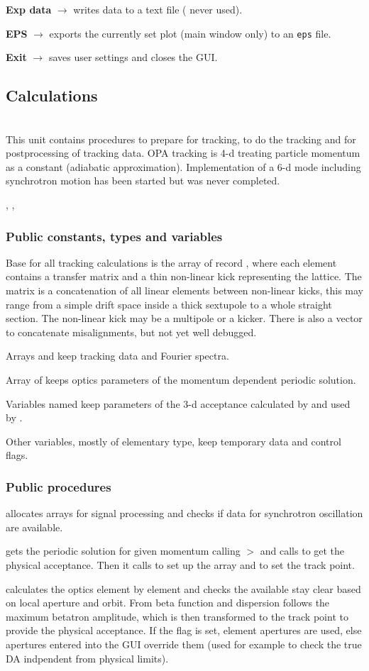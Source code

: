 \documentclass[12pt]{article}
\newcommand\code[1]{{\tt #1}}
\newcommand{\ofld}[1]{\colorbox{black!15}{{{\color{black}\bf #1}}}}
\newcommand\guico[1]{{\color{blue}\code{#1}}}
\newcommand{\unico}[1]{{\color{burntorange}\code{#1}}}
\newcommand{\evcod}[2]{\ofld{#1} $\rightarrow$ \guico{#2}}
\newcommand{\prcod}[2]{\opauni{#1}$>$\unico{#2}}
\newcommand{\opauni}[1]{\colorbox{orange!30}{{\color{black}\code{#1}}}}
\newcommand{\ounih}[2]{\subsection{\label{#2}#1}{\Huge\opauni{#2}}\\}
\newcommand{\ouni}[1]{\hyperref[#1]{\opauni{#1}}}
\newcommand{\uses}[1]{\flushleft {\bf Uses:} #1}
\newcommand{\desc}[1]{#1}
\newcommand{\pvar}[1]{\subsubsection*{Public constants, types and variables} #1}
\newcommand{\ppro}[1]{\subsubsection*{Public procedures} #1}
\newcommand{\todo}[1]{{\color{red} #1}}
\begin{document}
\evcod{Exp data}{butFileClick} writes data to a text file (\todo{never used}).

\evcod{EPS}{butPSClick} exports the currently set plot (main window only) to an \code{eps} file.

\evcod{Exit}{Exit} saves user settings and closes the GUI.


\ounih{Calculations}{tracklib}

\desc{This unit contains procedures to prepare for tracking, to do the tracking and for postprocessing of tracking data. OPA tracking is 4-d treating particle momentum as a constant (adiabatic approximation). \todo{Implementation of a 6-d mode including synchrotron motion has been started but was never completed.}
}

\uses{\ouni{linoplib}, \ouni{elemlib}, \ouni{globlib} \ouni{mathlib}}

\pvar{
Base for all tracking calculations is the array \unico{TMat} of record \unico{TrackMatrixType}, where each element contains a transfer matrix and a thin non-linear kick representing the lattice. The matrix is a concatenation of all linear elements between non-linear kicks, this may range from a simple drift space inside a thick sextupole to a whole straight section. The non-linear kick may be a multipole or a kicker. \todo{There is also a vector to concatenate misalignments, but not yet well debugged.}

Arrays \unico{data1,2} and \unico{FFT1,2} keep tracking data and Fourier spectra.

Array \unico{geodpp} of \unico{geodpp\_type} keeps optics parameters of the momentum dependent periodic solution.

Variables named \unico{FloP\dots} keep parameters of the 3-d acceptance calculated by \ouni{opatrackda} and used by \ouni{opatracktt}.

Other variables, mostly of elementary type, keep temporary data and control flags.
}

\ppro{}

\unico{TrackInit} allocates arrays for signal processing and checks if data for synchrotron oscillation are available.

\unico{Initdpp} gets the periodic solution for given momentum calling \prcod{linoplib}{ClosedOrbit,Periodic} and calls \unico{Acceptances} to get the physical acceptance. Then it calls \unico{TrackingMatrix} to set up the \unico{TMat} array and \unico{TrackPoint} to set the track point.

\unico{Acceptances} calculates the optics element by element and checks the available stay clear based on local aperture and orbit. From beta function and dispersion follows the maximum betatron amplitude, which is then transformed to the track point to provide the physical acceptance. If the flag \unico{elaper} is set, element apertures are used, else apertures entered into the GUI override them (used for example to check the true DA indpendent from physical limits).
\end{document}
